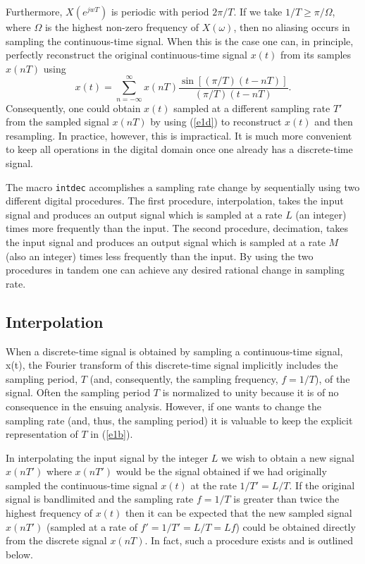 %
Furthermore, $X(e^{jwT})$ is periodic with period $2\pi/T$.  If
we take $1/T\ge\pi/\Omega$, where $\Omega$ is the highest
non-zero frequency of $X(\omega)$, then no aliasing occurs in sampling the 
continuous-time signal.  When this is the case one can, in principle,
perfectly reconstruct the original continuous-time signal $x(t)$
from its samples $x(nT)$ using
%
\begin{equation}
x(t)=\sum_{n=-\infty}^{\infty}
x(nT)\frac{\sin[(\pi/T)(t-nT)]}{(\pi/T)(t-nT)}.
\label{e1d}
\end{equation}
%
Consequently, one could obtain $x(t)$ sampled at a different sampling
rate $T'$ from the sampled signal $x(nT)$ by using (\ref{e1d}) 
to reconstruct $x(t)$ and
then resampling.  In practice, however, this is impractical.  It is
much more convenient to keep all operations in the digital domain
once one already has a discrete-time signal.

	The macro {\tt intdec} accomplishes
a sampling rate change by sequentially using two different 
digital procedures.
The first procedure, interpolation, takes the input
signal and produces an output signal which is sampled at a 
rate $L$ (an integer) times more frequently than the input.
The second procedure,  decimation,
takes the input signal and produces an output signal which 
is sampled at a rate $M$ (also an integer) times less frequently than the 
input.  By using the two
procedures in tandem one can achieve any desired rational
change in sampling rate.

\subsection{Interpolation}

	When a discrete-time signal is obtained by sampling a
continuous-time signal, x(t), the Fourier transform of this discrete-time
signal implicitly includes the sampling period, $T$
(and, consequently, the sampling frequency, $f=1/T$), of the signal.
Often the sampling period $T$ is normalized to unity
because it is of no consequence in the ensuing analysis.
However, if one wants to change the sampling rate
(and, thus, the sampling period) it is valuable to keep
the explicit representation of $T$ in (\ref{e1b}).

	In interpolating the input signal by the integer $L$
we wish to obtain a new signal $x(nT')$ where $x(nT')$ would
be the signal obtained if we had originally 
sampled the continuous-time signal $x(t)$ at the rate $1/T'=L/T$.
If the original signal is bandlimited and the sampling rate 
$f=1/T$ is greater than twice the
highest frequency of $x(t)$ then it can be expected that
the new sampled signal $x(nT')$ (sampled at a rate of
$f'=1/T'=L/T=Lf$) could be obtained directly from the discrete
signal $x(nT)$.
In fact, such a procedure exists and is outlined below.

